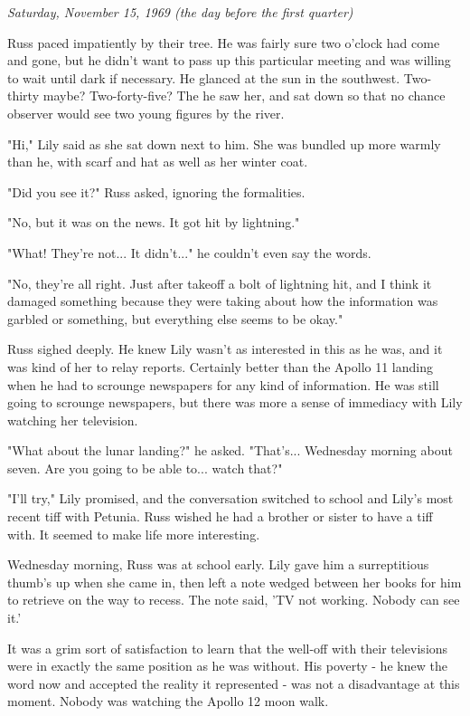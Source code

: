 \documentclass[a4paper,11pt]{article}
\begin{document}
\emph{Saturday, November 15, 1969 (the day before the first quarter)}

Russ paced impatiently by their tree. He was fairly sure two o'clock had come and gone, but he didn't want to pass up this particular meeting and was willing to wait until dark if necessary. He glanced at the sun in the southwest. Two-thirty maybe? Two-forty-five? The he saw her, and sat down so that no chance observer would see two young figures by the river.

"Hi," Lily said as she sat down next to him. She was bundled up more warmly than he, with scarf and hat as well as her winter coat.

"Did you see it?" Russ asked, ignoring the formalities.

"No, but it was on the news. It got hit by lightning."

"What! They're not... It didn't..." he couldn't even say the words.

"No, they're all right. Just after takeoff a bolt of lightning hit, and I think it damaged something because they were taking about how the information was garbled or something, but everything else seems to be okay."

Russ sighed deeply. He knew Lily wasn't as interested in this as he was, and it was kind of her to relay reports. Certainly better than the Apollo 11 landing when he had to scrounge newspapers for any kind of information. He was still going to scrounge newspapers, but there was more a sense of immediacy with Lily watching her television.

"What about the lunar landing?" he asked. "That's... Wednesday morning about seven. Are you going to be able to... watch that?"

"I'll try," Lily promised, and the conversation switched to school and Lily's most recent tiff with Petunia. Russ wished he had a brother or sister to have a tiff with. It seemed to make life more interesting.

Wednesday morning, Russ was at school early. Lily gave him a surreptitious thumb's up when she came in, then left a note wedged between her books for him to retrieve on the way to recess. The note said, 'TV not working. Nobody can see it.'

It was a grim sort of satisfaction to learn that the well-off with their televisions were in exactly the same position as he was without. His poverty - he knew the word now and accepted the reality it represented - was not a disadvantage at this moment. Nobody was watching the Apollo 12 moon walk.
\end{document}
